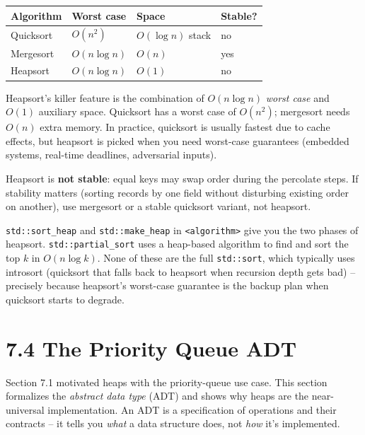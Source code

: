 \documentclass[11pt]{article}
\begin{document}
\begin{center}
\begin{tabular}{llll}
Algorithm & Worst case & Space & Stable? \\
\hline
Quicksort   & $O(n^2)$      & $O(\log n)$ stack & no \\
Mergesort   & $O(n \log n)$ & $O(n)$            & yes \\
Heapsort    & $O(n \log n)$ & $O(1)$            & no \\
\end{tabular}
\end{center}

Heapsort's killer feature is the combination of $O(n \log n)$ \emph{worst case} and $O(1)$ auxiliary space. Quicksort has a worst case of $O(n^2)$; mergesort needs $O(n)$ extra memory. In practice, quicksort is usually fastest due to cache effects, but heapsort is picked when you need worst-case guarantees (embedded systems, real-time deadlines, adversarial inputs).

\begin{warnbox}
Heapsort is \textbf{not stable}: equal keys may swap order during the percolate steps. If stability matters (sorting records by one field without disturbing existing order on another), use mergesort or a stable quicksort variant, not heapsort.
\end{warnbox}

\begin{notebox}
\texttt{std::sort\_heap} and \texttt{std::make\_heap} in \texttt{<algorithm>} give you the two phases of heapsort. \texttt{std::partial\_sort} uses a heap-based algorithm to find and sort the top $k$ in $O(n \log k)$. None of these are the full \texttt{std::sort}, which typically uses introsort (quicksort that falls back to heapsort when recursion depth gets bad) -- precisely because heapsort's worst-case guarantee is the backup plan when quicksort starts to degrade.
\end{notebox}

\section{7.4 The Priority Queue ADT}

Section 7.1 motivated heaps with the priority-queue use case. This section formalizes the \emph{abstract data type} (ADT) and shows why heaps are the near-universal implementation. An ADT is a specification of operations and their contracts -- it tells you \emph{what} a data structure does, not \emph{how} it's implemented.
\end{document}
